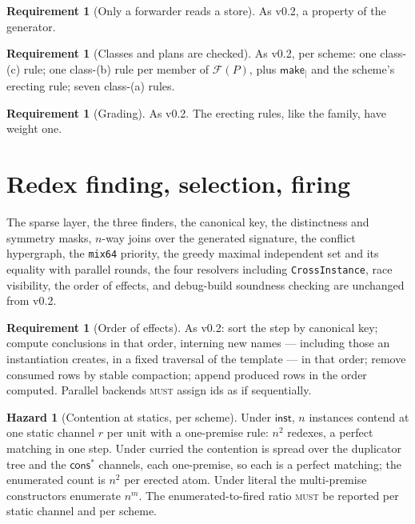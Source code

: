 \documentclass[11pt,a4paper]{article}
\newcommand{\code}[1]{\texttt{#1}}
\newcommand{\MUST}{\textsc{must}}
\theoremstyle{definition}
\newtheorem{requirement}[definition]{Requirement}
\newtheorem{hazard}[definition]{Hazard}
\theoremstyle{plain}
\newcommand{\inst}{\mathsf{inst}}
\newcommand{\Fam}{\mathcal{F}}
\newcommand{\cstar}{\mathsf{cons}^{*}}
\begin{document}
\begin{requirement}[Only a forwarder reads a store]\label{req:quietjoin}
As v0.2, a property of the generator.
\end{requirement}

\begin{requirement}[Classes and plans are checked]\label{req:plans}
As v0.2, per scheme: one class-(c) rule; one class-(b) rule per member of
$\Fam(P)$, plus $\mathsf{make}_{\mid}$ and the scheme's erecting rule; seven
class-(a) rules.
\end{requirement}

\begin{requirement}[Grading]\label{req:grading}
As v0.2. The erecting rules, like the family, have weight one.
\end{requirement}

\section{Redex finding, selection, firing}\label{sec:machine}

The sparse layer, the three finders, the canonical key, the distinctness and
symmetry masks, $n$-way joins over the generated signature, the conflict
hypergraph, the \code{mix64} priority, the greedy maximal independent set and
its equality with parallel rounds, the four resolvers including
\code{CrossInstance}, race visibility, the order of effects, and debug-build
soundness checking are unchanged from v0.2.

\begin{requirement}[Order of effects]\label{req:insertorder}
As v0.2: sort the step by canonical key; compute conclusions in that order,
interning new names --- including those an instantiation creates, in a fixed
traversal of the template --- in that order; remove consumed rows by stable
compaction; append produced rows in the order computed. Parallel backends
\MUST{} assign ids as if sequentially.
\end{requirement}

\begin{hazard}[Contention at statics, per scheme]\label{haz:statics}
Under $\inst$, $n$ instances contend at one static channel $r$ per unit with a
one-premise rule: $n^{2}$ redexes, a perfect matching in one step. Under
curried the contention is spread over the duplicator tree and the $\cstar$
channels, each one-premise, so each is a perfect matching; the enumerated
count is $n^{2}$ per erected atom. Under literal the multi-premise
constructors enumerate $n^{m}$. The enumerated-to-fired ratio \MUST{} be
reported per static channel and per scheme.
\end{hazard}
\end{document}
